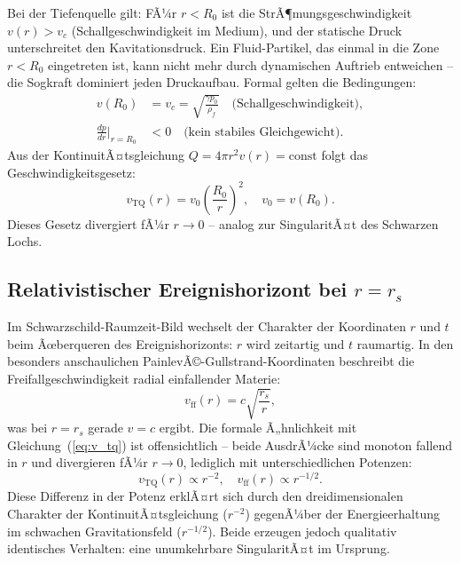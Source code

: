 ﻿\documentclass[12pt,a4paper]{report}
\begin{document}
Bei der Tiefenquelle gilt: FÃ¼r $r < R_0$ ist die StrÃ¶mungsgeschwindigkeit $v(r) > v_c$ (Schallgeschwindigkeit im Medium), und der statische Druck unterschreitet den Kavitationsdruck. Ein Fluid-Partikel, das einmal in die Zone $r < R_0$ eingetreten ist, kann nicht mehr durch dynamischen Auftrieb entweichen -- die Sogkraft dominiert jeden Druckaufbau. Formal gelten die Bedingungen:
\begin{align}
	v(R_0) &= v_c = \sqrt{\frac{\gamma p_0}{\rho_f}} \quad \text{(Schallgeschwindigkeit)}, \label{eq:bedingung_r0}\\
	\frac{dp}{dr}\bigg|_{r=R_0} &< 0 \quad \text{(kein stabiles Gleichgewicht)}.
	\label{eq:instabilitaet_r0}
\end{align}
Aus der KontinuitÃ¤tsgleichung $Q = 4\pi r^2 v(r) = \mathrm{const}$ folgt das Geschwindigkeitsgesetz:
\begin{equation}
	v_{\mathrm{TQ}}(r) = v_0 \left(\frac{R_0}{r}\right)^2, \quad v_0 = v(R_0).
	\label{eq:v_tq}
\end{equation}
Dieses Gesetz divergiert fÃ¼r $r \to 0$ -- analog zur SingularitÃ¤t des Schwarzen Lochs.

\subsection{Relativistischer Ereignishorizont bei $r = r_s$}

Im Schwarzschild-Raumzeit-Bild wechselt der Charakter der Koordinaten $r$ und $t$ beim Ãœberqueren des Ereignishorizonts: $r$ wird zeitartig und $t$ raumartig. In den besonders anschaulichen PainlevÃ©-Gullstrand-Koordinaten \cite{painleve1921} beschreibt die Freifallgeschwindigkeit radial einfallender Materie:
\begin{equation}
	v_{\mathrm{ff}}(r) = c\sqrt{\frac{r_s}{r}},
	\label{eq:v_ff_bh}
\end{equation}
was bei $r = r_s$ gerade $v = c$ ergibt. Die formale Ã„hnlichkeit mit Gleichung~(\ref{eq:v_tq}) ist offensichtlich -- beide AusdrÃ¼cke sind monoton fallend in $r$ und divergieren fÃ¼r $r \to 0$, lediglich mit unterschiedlichen Potenzen:
\begin{equation}
	v_{\mathrm{TQ}}(r) \propto r^{-2}, \quad v_{\mathrm{ff}}(r) \propto r^{-1/2}.
	\label{eq:potenz_vergleich}
\end{equation}
Diese Differenz in der Potenz erklÃ¤rt sich durch den dreidimensionalen Charakter der KontinuitÃ¤tsgleichung ($r^{-2}$) gegenÃ¼ber der Energieerhaltung im schwachen Gravitationsfeld ($r^{-1/2}$). Beide erzeugen jedoch qualitativ identisches Verhalten: eine unumkehrbare SingularitÃ¤t im Ursprung.
\end{document}
